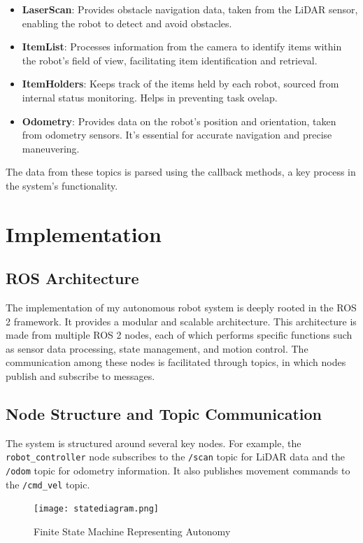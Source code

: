 \documentclass[conference]{IEEEtran}
\begin{document}
\begin{itemize}
    \item \textbf{LaserScan}: Provides obstacle navigation data, taken from the LiDAR sensor, enabling the robot to detect and avoid obstacles.
    \item \textbf{ItemList}: Processes information from the camera to identify items within the robot's field of view, facilitating item identification and retrieval.
    \item \textbf{ItemHolders}: Keeps track of the items held by each robot, sourced from internal status monitoring. Helps in preventing task ovelap.
    \item \textbf{Odometry}: Provides data on the robot's position and orientation, taken from odometry sensors. It's essential for accurate navigation and precise maneuvering.
\end{itemize}

The data from these topics is parsed using the callback methods, a key process in the system's functionality.

\section{Implementation}
\subsection{ROS Architecture}
The implementation of my autonomous robot system is deeply rooted in the ROS 2 framework. It provides a modular and scalable architecture. This architecture is made from multiple ROS 2 nodes, each of which performs specific functions such as sensor data processing, state management, and motion control. The communication among these nodes is facilitated through topics, in which nodes publish and subscribe to messages.

\subsection{Node Structure and Topic Communication}
The system is structured around several key nodes. For example, the \texttt{robot\_controller} node subscribes to the \texttt{/scan} topic for LiDAR data and the \texttt{/odom} topic for odometry information. It also publishes movement commands to the \texttt{/cmd\_vel} topic.

\begin{figure}[htbp]
\centerline{\texttt{[image: statediagram.png]}}
\caption{Finite State Machine Representing Autonomy}
\label{fig:statemachine}
\end{figure}
\end{document}
